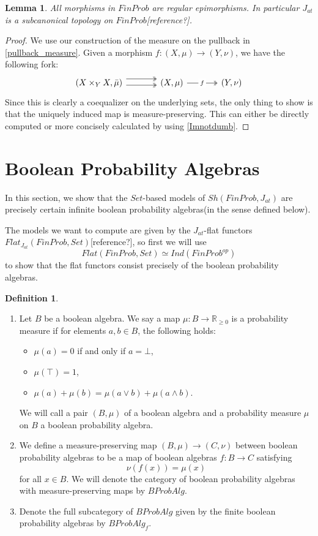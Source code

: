 \documentclass[a4paper,draft]{amsproc}
\theoremstyle{plain}
\newtheorem{lemma}{Lemma}[section]
\theoremstyle{definition}
\newtheorem{definition}{Definition}[section]
\theoremstyle{remark}
\numberwithin{equation}{section}
\begin{document}
\begin{lemma}\label{subcanonical} All morphisms in $FinProb$ are regular epimorphisms. In particular $J_{at}$ is a subcanonical topology on $FinProb$[reference?].
\end{lemma}
\begin{proof}
We use our construction of the measure on the pullback in \ref{pullback_measure}. Given a morphism $f:(X,\mu)\rightarrow (Y, \nu)$, we have the following fork:
\[
\begin{tikzcd}[column sep=large]
(X \times_Y X, \bar{\mu}) \arrow[r, two heads, shift left=2] \arrow[r, two heads, shift right] & (X,\mu) \arrow[r, "f" description, two heads] & (Y,\nu)
\end{tikzcd}
\]
Since this is clearly a coequalizer on the underlying sets, the only thing to show is that the uniquely induced map is measure-preserving. This can either be directly computed or more concisely calculated by using \ref{Imnotdumb}.
\end{proof}

\section{Boolean Probability Algebras}

In this section, we show that the $Set$-based models of $Sh(FinProb, J_{at})$ are precisely certain infinite boolean probability algebras(in the sense defined below).

The models we want to compute are given by the $J_{at}$-flat functors $Flat_{J_{at}}(FinProb, Set)$[reference?], so first we will use 
\[
Flat(FinProb, Set) \simeq Ind(FinProb^{op})
\]
to show that the flat functors consist precisely of the boolean probability algebras.

\begin{definition}
\begin{enumerate}
\item Let $B$ be a boolean algebra. We say a map $\mu: B \to \mathbb{R}_{\geq 0}$ is a probability measure if for elements $a,b \in B$, the following holds:
\begin{itemize}
\item $\mu(a) = 0$ if and only if $a = \bot $,
\item $\mu(\top) = 1$,
\item $\mu(a) + \mu(b) = \mu(a \vee b) + \mu(a \wedge b)$.
\end{itemize}
We will call a pair $(B, \mu)$ of a boolean algebra and a probability measure $\mu$ on $B$ a boolean probability algebra.
\item We define a measure-preserving map $(B, \mu) \to (C, \nu)$ between boolean probability algebras to be a map of boolean algebras $f: B \to C$ satisfying
\[
\nu(f(x)) = \mu(x)
\]
for all $x \in B$. We will denote the category of boolean probability algebras with measure-preserving maps by $BProbAlg$.
\item Denote the full subcategory of $BProbAlg$ given by the finite boolean probability algebras by $BProbAlg_f$.
\end{enumerate}
\end{definition}
\end{document}
